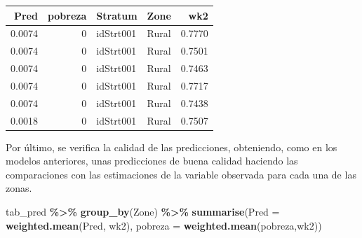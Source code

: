 \documentclass[
  12pt,
]{book}
\newenvironment{Shaded}{\begin{snugshade}}{\end{snugshade}}
\newcommand{\AttributeTok}[1]{\textcolor[rgb]{0.13,0.29,0.53}{#1}}
\newcommand{\DataTypeTok}[1]{\textcolor[rgb]{0.13,0.29,0.53}{#1}}
\newcommand{\DecValTok}[1]{\textcolor[rgb]{0.00,0.00,0.81}{#1}}
\newcommand{\FunctionTok}[1]{\textcolor[rgb]{0.13,0.29,0.53}{\textbf{#1}}}
\newcommand{\NormalTok}[1]{#1}
\newcommand{\OtherTok}[1]{\textcolor[rgb]{0.56,0.35,0.01}{#1}}
\newcommand{\SpecialCharTok}[1]{\textcolor[rgb]{0.81,0.36,0.00}{\textbf{#1}}}
\newcommand{\StringTok}[1]{\textcolor[rgb]{0.31,0.60,0.02}{#1}}
\begin{document}
\begin{Shaded}
\end{Shaded}

\begin{tabular}{r|r|l|l|r}
\hline
Pred & pobreza & Stratum & Zone & wk2\\
\hline
0.0074 & 0 & idStrt001 & Rural & 0.7770\\
\hline
0.0074 & 0 & idStrt001 & Rural & 0.7501\\
\hline
0.0074 & 0 & idStrt001 & Rural & 0.7463\\
\hline
0.0074 & 0 & idStrt001 & Rural & 0.7717\\
\hline
0.0074 & 0 & idStrt001 & Rural & 0.7438\\
\hline
0.0018 & 0 & idStrt001 & Rural & 0.7507\\
\hline
\end{tabular}

Por último, se verifica la calidad de las predicciones, obteniendo, como en los modelos anteriores, unas predicciones de buena calidad haciendo las comparaciones con las estimaciones de la variable observada para cada una de las zonas.

\begin{Shaded}
\begin{Highlighting}[]
\NormalTok{tab\_pred }\SpecialCharTok{\%\textgreater{}\%} \FunctionTok{group\_by}\NormalTok{(Zone) }\SpecialCharTok{\%\textgreater{}\%} 
  \FunctionTok{summarise}\NormalTok{(}\AttributeTok{Pred =} \FunctionTok{weighted.mean}\NormalTok{(Pred, wk2), }
            \AttributeTok{pobreza =} \FunctionTok{weighted.mean}\NormalTok{(pobreza,wk2))}
\end{Highlighting}
\end{Shaded}
\end{document}
